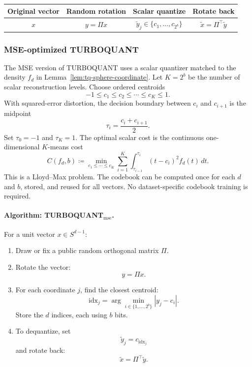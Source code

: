 \begin{center}
\begin{tabular}{c|c|c|c}
Original vector & Random rotation & Scalar quantize & Rotate back \\
\hline
$x$ & $y=\Pi x$ & $\widetilde y_j\in\{c_1,\dots,c_{2^b}\}$ & $\widetilde x=\Pi^\top \widetilde y$
\end{tabular}
\end{center}

\subsubsection*{MSE-optimized TURBOQUANT}

The MSE version of TURBOQUANT uses a scalar quantizer matched to the density $f_d$ in Lemma~\ref{lem:tq-sphere-coordinate}.
Let $K=2^b$ be the number of scalar reconstruction levels.
Choose ordered centroids
\begin{equation}
    -1\le c_1\le c_2\le \cdots\le c_K\le 1.
\end{equation}
With squared-error distortion, the decision boundary between $c_i$ and $c_{i+1}$ is the midpoint
\begin{equation}
    \tau_i=\frac{c_i+c_{i+1}}2.
\end{equation}
Set $\tau_0=-1$ and $\tau_K=1$.
The optimal scalar cost is the continuous one-dimensional $K$-means cost
\begin{equation}
\label{eq:tq-scalar-cost}
    C(f_d,b)
    \coloneqq
    \min_{c_1\le\cdots\le c_K}
    \sum_{i=1}^{K}
    \int_{\tau_{i-1}}^{\tau_i} (t-c_i)^2 f_d(t)\,dt.
\end{equation}
This is a Lloyd--Max problem.
The codebook can be computed once for each $d$ and $b$, stored, and reused for all vectors.
No dataset-specific codebook training is required.

\paragraph{Algorithm: \textsc{TURBOQUANT}$_{\mathrm{mse}}$.}
For a unit vector $x\in S^{d-1}$:
\begin{enumerate}[leftmargin=2em]
    \item Draw or fix a public random orthogonal matrix $\Pi$.
    \item Rotate the vector:
    \[
        y=\Pi x.
    \]
    \item For each coordinate $j$, find the closest centroid:
    \[
        \mathrm{idx}_j=\arg\min_{i\in\{1,\dots,2^b\}} |y_j-c_i|.
    \]
    Store the $d$ indices, each using $b$ bits.
    \item To dequantize, set
    \[
        \widetilde y_j=c_{\mathrm{idx}_j}
    \]
    and rotate back:
    \[
        \widetilde x=\Pi^\top \widetilde y.
    \]
\end{enumerate}

